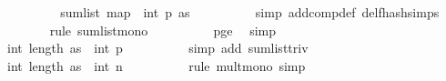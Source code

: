 \begin{isabellebody}
\ \ \ \ \ \ \isamarkupfalse%
\ \isamarkupfalse%
\ {\isachardoublequoteopen}{\isachardot}{\kern0pt}{\isachardot}{\kern0pt}{\isachardot}{\kern0pt}\ {\isasymle}\ sum{\isacharunderscore}{\kern0pt}list\ {\isacharparenleft}{\kern0pt}map\ {\isacharparenleft}{\kern0pt}{\isasymlambda}{\isacharunderscore}{\kern0pt}{\isachardot}{\kern0pt}\ {\isacharparenleft}{\kern0pt}int\ p{\isacharplus}{\kern0pt}{}{\isacharparenright}{\kern0pt}{\isacharparenright}{\kern0pt}\ as{\isacharparenright}{\kern0pt}{\isachardoublequoteclose}\isanewline
\ \ \ \ \ \ \ \ \isamarkupfalse%
\ {\isacharparenleft}{\kern0pt}simp\ add{\isacharcolon}{\kern0pt}comp{\isacharunderscore}{\kern0pt}def\ del{\isacharcolon}{\kern0pt}f{}{\isacharunderscore}{\kern0pt}hash{\isachardot}{\kern0pt}simps{\isacharparenright}{\kern0pt}\isanewline
\ \ \ \ \ \ \ \ \isamarkupfalse%
\ {\isacharparenleft}{\kern0pt}rule\ sum{\isacharunderscore}{\kern0pt}list{\isacharunderscore}{\kern0pt}mono{\isacharparenright}{\kern0pt}\isanewline
\ \ \ \ \ \ \ \ \isamarkupfalse%
\ p{\isacharunderscore}{\kern0pt}ge{\isacharunderscore}{\kern0pt}{}\ \isamarkupfalse%
\ simp\ \isanewline
\ \ \ \ \ \ \isamarkupfalse%
\ \isamarkupfalse%
\ {\isachardoublequoteopen}{\isachardot}{\kern0pt}{\isachardot}{\kern0pt}{\isachardot}{\kern0pt}\ {\isacharequal}{\kern0pt}\ int\ {\isacharparenleft}{\kern0pt}length\ as{\isacharparenright}{\kern0pt}\ {\isacharasterisk}{\kern0pt}\ {\isacharparenleft}{\kern0pt}int\ p{\isacharplus}{\kern0pt}{}{\isacharparenright}{\kern0pt}{\isachardoublequoteclose}\isanewline
\ \ \ \ \ \ \ \ \isamarkupfalse%
\ {\isacharparenleft}{\kern0pt}simp\ add{\isacharcolon}{\kern0pt}\ sum{\isacharunderscore}{\kern0pt}list{\isacharunderscore}{\kern0pt}triv{\isacharparenright}{\kern0pt}\isanewline
\ \ \ \ \ \ \isamarkupfalse%
\ \isamarkupfalse%
\ {\isachardoublequoteopen}{\isachardot}{\kern0pt}{\isachardot}{\kern0pt}{\isachardot}{\kern0pt}\ {\isasymle}\ int\ {\isacharparenleft}{\kern0pt}length\ as{\isacharparenright}{\kern0pt}\ {\isacharasterisk}{\kern0pt}\ {\isacharparenleft}{\kern0pt}{}{\isacharplus}{\kern0pt}{}{\isacharasterisk}{\kern0pt}{\isacharparenleft}{\kern0pt}int\ n{\isacharparenright}{\kern0pt}{\isacharparenright}{\kern0pt}{\isachardoublequoteclose}\isanewline
\ \ \ \ \ \ \ \ \isamarkupfalse%
\ {\isacharparenleft}{\kern0pt}rule\ mult{\isacharunderscore}{\kern0pt}mono{\isacharcomma}{\kern0pt}\ simp{\isacharparenright}{\kern0pt}\isanewline

\end{isabellebody}
